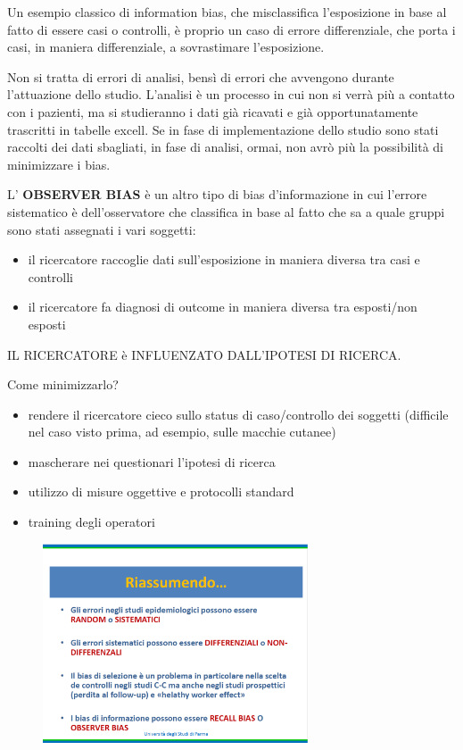 Un esempio classico di information bias, che misclassifica l'esposizione
in base al fatto di essere casi o controlli, è proprio un caso di errore
differenziale, che porta i casi, in maniera differenziale, a
sovrastimare l'esposizione.

Non si tratta di errori di analisi, bensì di errori che avvengono
durante l'attuazione dello studio. L'analisi è un processo in cui non si
verrà più a contatto con i pazienti, ma si studieranno i dati già
ricavati e già opportunatamente trascritti in tabelle excell. Se in fase
di implementazione dello studio sono stati raccolti dei dati sbagliati,
in fase di analisi, ormai, non avrò più la possibilità di minimizzare i
bias.

L' \textbf{OBSERVER BIAS} è un altro tipo di bias d'informazione in cui
l'errore sistematico è dell'osservatore che classifica in base al fatto
che sa a quale gruppi sono stati assegnati i vari soggetti:

\begin{itemize}
\item
  il ricercatore raccoglie dati sull'esposizione in maniera diversa tra
  casi e controlli
\item
  il ricercatore fa diagnosi di outcome in maniera diversa tra
  esposti/non esposti
\end{itemize}

IL RICERCATORE è INFLUENZATO DALL'IPOTESI DI RICERCA.

Come minimizzarlo?

\begin{itemize}
\item
  rendere il ricercatore cieco sullo status di caso/controllo dei
  soggetti (difficile nel caso visto prima, ad esempio, sulle macchie
  cutanee)
\item
  mascherare nei questionari l'ipotesi di ricerca
\item
  utilizzo di misure oggettive e protocolli standard
\item
  training degli operatori
\end{itemize}

\begin{figure}[!ht]
\centering
\includegraphics[width=0.7\textwidth]{05/image9.png}
\end{figure}

